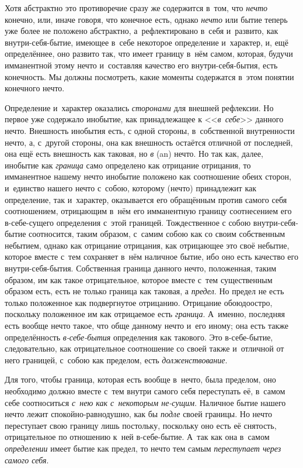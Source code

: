 \label{ssssec:beta}

Хотя абстрактно это противоречие сразу же содержится в~том, что
{\em нечто} конечно, или, иначе говоря, что конечное
есть, однако {\em нечто} или бытие теперь уже более не
положено абстрактно, а~рефлектировано в~себя и~развито, как
внутри-себя-бытие, имеющее в~себе некоторое определение и~характер, и, ещё
определённее, оно развито так, что имеет границу в~нём самом, которая,
будучи имманентной этому нечто и~составляя качество его внутри-себя-бытия,
есть конечность. Мы должны посмотреть, какие моменты содержатся в~этом
понятии конечного нечто.

Определение и~характер оказались {\em сторонами} для
внешней рефлексии. Но первое уже содержало инобытие, как принадлежащее к
<<{\em в~себе}>> данного нечто. Внешность инобытия есть,
с одной стороны, в~собственной внутренности нечто, а, с~другой стороны, она
как внешность остаётся отличной от последней, она ещё есть внешность как
таковая, но {\em в} (an) нечто. Но так как, далее,
инобытие как {\em граница} само определено как
отрицание отрицания, то имманентное нашему нечто инобытие положено как
соотношение обеих сторон, и~единство нашего нечто с~собою, которому (нечто)
принадлежит как определение, так и~характер, оказывается его обращённым
против самого себя соотношением, отрицающим в~нём его имманентную границу
соотнесением его в-себе-сущего определения с~этой границей. Тождественное с
собою внутри-себя-бытие соотносится, таким образом, с~самим собою как со
своим собственным небытием, однако как отрицание отрицания, как отрицающее
это своё небытие, которое вместе с~тем сохраняет в~нём наличное бытие, ибо
оно есть качество его внутри-себя-бытия. Собственная граница данного нечто,
положенная, таким образом, им как такое отрицательное, которое вместе с~тем
существенным образом есть, есть не только граница как таковая, а
{\em предел}. Но предел не есть только положенное как
подвергнутое отрицанию. Отрицание обоюдоостро, поскольку положенное им как
отрицаемое есть {\em граница}. А~именно, последняя есть
вообще нечто такое, что обще данному нечто и~его иному; она есть также
определённость {\em в-себе-бытия} определения как
такового. Это в-себе-бытие, следовательно, как отрицательное соотношение со
своей также и~отличной от него границей, с~собою как пределом, есть
{\em долженствование}.

Для того, чтобы граница, которая есть вообще в~нечто, была пределом, оно
необходимо должно вместе с~тем внутри самого себя переступать её, в~самом
себе соотноситься {\em с~нею как с~некоторым не-сущим}.
Наличное бытие нашего нечто лежит спокойно-равнодушно, как бы
{\em подле} своей границы. Но нечто переступает свою
границу лишь постольку, поскольку оно есть её снятость, отрицательное по
отношению к~ней в-себе-бытие. А~так как она в~самом
{\em определении} имеет бытие как предел, то нечто тем
самым {\em переступает через самого себя}.


